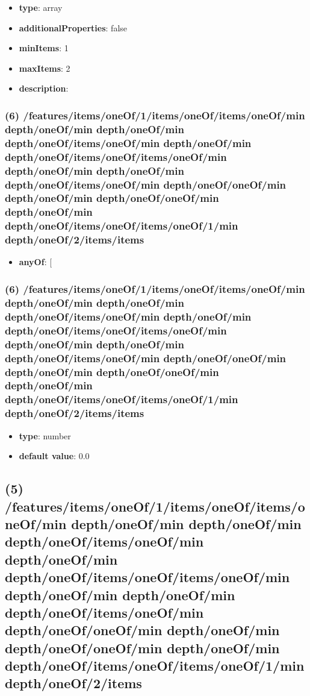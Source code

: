 \begin{itemize}[leftmargin=5em]\item {\bf type}: array
\item {\bf additionalProperties}: false
\item {\bf minItems}: 1
\item {\bf maxItems}: 2
\item {\bf description}: 
\end{itemize}\subsubsection{(6) /features/items/oneOf/1/items/oneOf/items/oneOf/min depth/oneOf/min depth/oneOf/min depth/oneOf/items/oneOf/min depth/oneOf/min depth/oneOf/items/oneOf/items/oneOf/min depth/oneOf/min depth/oneOf/min depth/oneOf/items/oneOf/min depth/oneOf/oneOf/min depth/oneOf/min depth/oneOf/oneOf/min depth/oneOf/min depth/oneOf/items/oneOf/items/oneOf/1/min depth/oneOf/2/items/items}
\begin{itemize}[leftmargin=6em]\item {\bf anyOf}: [\end{itemize}\subsubsection{(6) /features/items/oneOf/1/items/oneOf/items/oneOf/min depth/oneOf/min depth/oneOf/min depth/oneOf/items/oneOf/min depth/oneOf/min depth/oneOf/items/oneOf/items/oneOf/min depth/oneOf/min depth/oneOf/min depth/oneOf/items/oneOf/min depth/oneOf/oneOf/min depth/oneOf/min depth/oneOf/oneOf/min depth/oneOf/min depth/oneOf/items/oneOf/items/oneOf/1/min depth/oneOf/2/items/items}
\begin{itemize}[leftmargin=6em]\item {\bf type}: number\item {\bf default value}: 0.0
\end{itemize}\subsection{(5) /features/items/oneOf/1/items/oneOf/items/oneOf/min depth/oneOf/min depth/oneOf/min depth/oneOf/items/oneOf/min depth/oneOf/min depth/oneOf/items/oneOf/items/oneOf/min depth/oneOf/min depth/oneOf/min depth/oneOf/items/oneOf/min depth/oneOf/oneOf/min depth/oneOf/min depth/oneOf/oneOf/min depth/oneOf/min depth/oneOf/items/oneOf/items/oneOf/1/min depth/oneOf/2/items}
